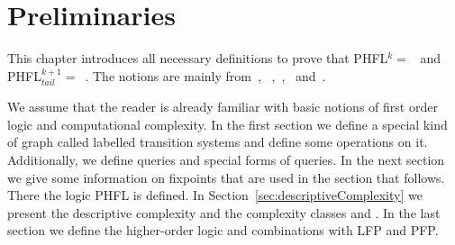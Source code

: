 \chapter{Preliminaries}
\label{ch:preliminaries}
This chapter introduces all necessary definitions to prove that PHFL$^k =$~ and
PHFL$^{k+1}_{tail} =$~. The notions are mainly from~\cite{immerman1999descriptive},
~\cite{papadimitriou1994complexity},~\cite{otto1999bisimulation},~\cite{freireMartins2011descriptive}
and~\cite{lange2014capturing}.

We assume that the reader is already familiar with basic notions of first order logic and 
computational complexity. In the first section we define a special kind of graph called labelled transition systems and 
define some operations on it. Additionally, we define queries and special forms of queries. 
In the next section we give some information on fixpoints that are used in the section that follows. 
There the logic PHFL is defined. In Section~\ref{sec:descriptiveComplexity} we present the 
descriptive complexity and the complexity classes  and . In the last section we define the higher-order logic and combinations with LFP and PFP.










